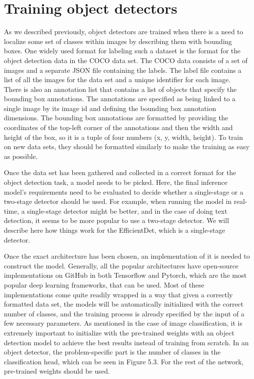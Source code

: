 \section{Training object detectors}
As we described previously, object detectors are trained when there is a need to localize some set of classes within images by describing them with bounding boxes.
One widely used format for labeling such a dataset is the format for the object detection data in the COCO data set.
The COCO data consists of a set of images and a separate JSON file containing the labels.
The label file contains a list of all the images for the data set and a unique identifier for each image.
There is also an annotation list that contains a list of objects that specify the bounding box annotations.
The annotations are specified as being linked to a single image by its image id and defining the bounding box annotation dimensions.
The bounding box annotations are formatted by providing the coordinates of the top-left corner of the annotations and then the width and height of the box, so it is a tuple of four numbers (x, y, width, height).
To train on new data sets, they should be formatted similarly to make the training as easy as possible.

Once the data set has been gathered and collected in a correct format for the object detection task, a model needs to be picked.
Here, the final inference model's requirements need to be evaluated to decide whether a single-stage or a two-stage detector should be used.
For example, when running the model in real-time, a single-stage detector might be better, and in the case of doing text detection, it seems to be more popular to use a two-stage detector.
We will describe here how things work for the EfficientDet, which is a single-stage detector.

Once the exact architecture has been chosen, an implementation of it is needed to construct the model.
Generally, all the popular architectures have open-source implementations on GitHub in both Tensorflow and Pytorch, which are the most popular deep learning frameworks, that can be used.
Most of these implementations come quite readily wrapped in a way that given a correctly formatted data set, the models will be automatically initialized with the correct number of classes, and the training process is already specified by the input of a few necessary parameters.
As mentioned in the case of image classification, it is extremely important to initialize with the pre-trained weights with an object detection model to achieve the best results instead of training from scratch.
In an object detector, the problem-specific part is the number of classes in the classification head, which can be seen in Figure 5.3.
For the rest of the network, pre-trained weights should be used.

